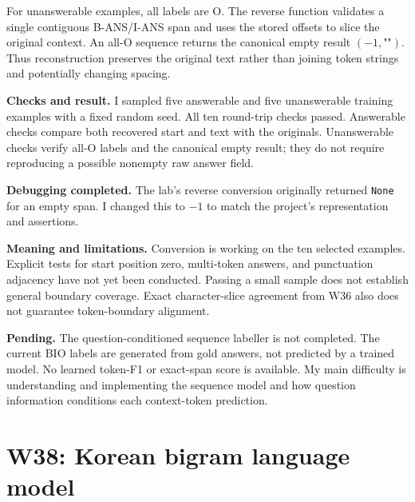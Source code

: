 \documentclass[11pt,a4paper]{article}
\begin{document}
For unanswerable examples, all labels are O. The reverse function validates a single contiguous B-ANS/I-ANS span and uses the stored offsets to slice the original context. An all-O sequence returns the canonical empty result $(-1,\texttt{""})$. Thus reconstruction preserves the original text rather than joining token strings and potentially changing spacing.

\textbf{Checks and result.} I sampled five answerable and five unanswerable training examples with a fixed random seed. All ten round-trip checks passed. Answerable checks compare both recovered start and text with the originals. Unanswerable checks verify all-O labels and the canonical empty result; they do not require reproducing a possible nonempty raw answer field.

\textbf{Debugging completed.} The lab's reverse conversion originally returned \texttt{None} for an empty span. I changed this to $-1$ to match the project's representation and assertions.

\textbf{Meaning and limitations.} Conversion is working on the ten selected examples. Explicit tests for start position zero, multi-token answers, and punctuation adjacency have not yet been conducted. Passing a small sample does not establish general boundary coverage. Exact character-slice agreement from W36 also does not guarantee token-boundary alignment.

\textbf{Pending.} The question-conditioned sequence labeller is not completed. The current BIO labels are generated from gold answers, not predicted by a trained model. No learned token-F1 or exact-span score is available. My main difficulty is understanding and implementing the sequence model and how question information conditions each context-token prediction.

\section{W38: Korean bigram language model}
\end{document}
